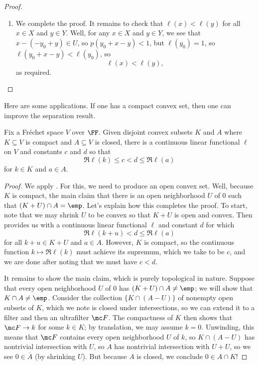 \documentclass[notes.tex]{subfiles}
\begin{document}
\begin{proof}
\begin{enumerate}
		\item We complete the proof. It remains to check that $\ell(x)<\ell(y)$ for all $x\in X$ and $y\in Y$. Well, for any $x\in X$ and $y\in Y$, we see that $x-(-y_0+y)\in U$, so $p(y_0+x-y)<1$, but $\ell(y_0)=1$, so $\ell(y_0+x-y)<\ell(y_0)$, so
		\[\ell(x)<\ell(y),\]
		as required.
		\qedhere
	\end{enumerate}
\end{proof}
Here are some applications. If one has a compact convex set, then one can improve the separation result.
\begin{corollary} \label{cor:separate-compact}
	Fix a Fr\'echet space $V$ over $\FF$. Given disjoint convex subsets $K$ and $A$ where $K\subseteq V$ is compact and $A\subseteq V$ is closed, there is a continuous linear functional $\ell$ on $V$ and constants $c$ and $d$ so that
	\[\Re\ell(k)\le c<d\le\Re\ell(a)\]
	for $k\in K$ and $a\in A$.
\end{corollary}
\begin{proof}
	We apply . For this, we need to produce an open convex set. Well, because $K$ is compact, the main claim that there is an open neighborhood $U$ of $0$ such that $(K+U)\cap A=\emp$. Let's explain how this completes the proof. To start, note that we may shrink $U$ to be convex so that $K+U$ is open and convex. Then  provides us with a continuous linear functional $\ell$ and constant $d$ for which
	\[\Re\ell(k+u)<d\le\Re\ell(a)\]
	for all $k+u\in K+U$ and $a\in A$. However, $K$ is compact, so the continuous function $k\mapsto\Re\ell(k)$ must achieve its supremum, which we take to be $c$, and we are done after noting that we must have $c<d$.

	It remains to show the main claim, which is purely topological in nature. Suppose that every open neighborhood $U$ of $0$ has $(K+U)\cap A\ne\emp$; we will show that $K\cap A\ne\emp$. Consider the collection $\{K\cap (A-U)\}$ of nonempty open subsets of $K$, which we note is closed under intersections, so we can extend it to a filter and then an ultrafilter $\mc F$. The compactness of $K$ then shows that $\mc F\to k$ for some $k\in K$; by translation, we may assume $k=0$. Unwinding, this means that $\mc F$ contains every open neighborhood $U$ of $k$, so $K\cap(A-U)$ has nontrivial intersection with $U$, so $A$ has nontrivial intersection with $U+U$, so we see $0\in\overline A$ (by shrinking $U$). But because $A$ is closed, we conclude $0\in A\cap K$!
\end{proof}
\end{document}
